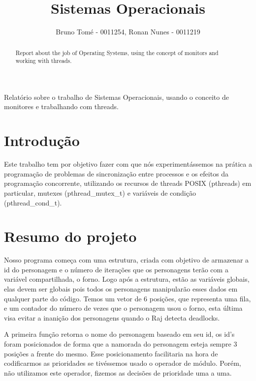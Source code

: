 \documentclass[12pt]{article}
\title{Sistemas Operacionais}
\author{Bruno Tomé - 0011254\inst{1}, Ronan Nunes - 0011219\inst{1}}
\begin{document}
 

\maketitle

\begin{abstract}
Report about the job of Operating Systems, using the concept of monitors and working with threads.

\end{abstract}
     
\begin{resumo} 
Relatório sobre o trabalho de Sistemas Operacionais, usando o conceito de monitores e trabalhando com threads.

\end{resumo}

\section{Introdução}

Este trabalho tem por objetivo fazer com que nós experimentássemos na prática a programação de problemas de sincronização entre processos e os efeitos da programação concorrente, utilizando os recursos de threads POSIX (pthreads) em particular, mutexes (pthread\_mutex\_t) e variáveis de condição (pthread\_cond\_t).

\section{Resumo do projeto}

Nosso programa começa com uma estrutura, criada com objetivo de armazenar a id do personagem e o número de iterações que os personagens terão com a variável compartilhada, o forno. Logo após a estrutura, estão as variáveis globais, elas devem ser globais pois todos os personagens manipularão esses dados em qualquer parte do código. Temos um vetor de 6 posições, que representa uma fila, e um contador do número de vezes que o personagem usou o forno, esta última visa evitar a inanição dos personagens quando o Raj detecta deadlocks.

A primeira função retorna o nome do personagem baseado em seu id, os id's foram posicionados de forma que a namorada do personagem esteja sempre 3 posições a frente do mesmo. Esse posicionamento facilitaria na hora de codificarmos as prioridades se tivéssemos usado o operador de módulo. Porém, não utilizamos este operador, fizemos as decisões de prioridade uma a uma.
\end{document}
